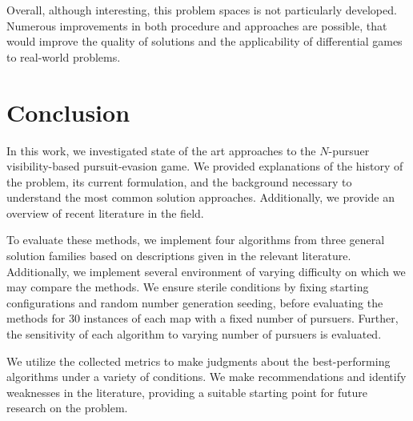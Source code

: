 \documentclass[conference]{IEEEtran}
\begin{document}
Overall, although interesting, this problem spaces is not particularly developed.
Numerous improvements in both procedure and approaches are possible, that would improve the quality of solutions and the applicability of differential games to real-world problems.

\section{Conclusion}

In this work, we investigated state of the art approaches to the $N$-pursuer visibility-based pursuit-evasion game.
We provided explanations of the history of the problem, its current formulation, and the background necessary to understand the most common solution approaches.
Additionally, we provide an overview of recent literature in the field.

To evaluate these methods, we implement four algorithms from three general solution families based on descriptions given in the relevant literature.
Additionally, we implement several environment of varying difficulty on which we may compare the methods.
We ensure sterile conditions by fixing starting configurations and random number generation seeding, before evaluating the methods for $30$ instances of each map with a fixed number of pursuers.
Further, the sensitivity of each algorithm to varying number of pursuers is evaluated.

We utilize the collected metrics to make judgments about the best-performing algorithms under a variety of conditions.
We make recommendations and identify weaknesses in the literature, providing a suitable starting point for future research on the problem.




\end{document}
